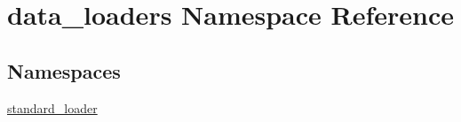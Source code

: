 \hypertarget{namespacedata__loaders}{}\section{data\+\_\+loaders Namespace Reference}
\label{namespacedata__loaders}
\subsection*{Namespaces}
\begin{DoxyCompactItemize}
\item 
 \mbox{\hyperlink{namespacedata__loaders_1_1standard__loader}{standard\+\_\+loader}}
\end{DoxyCompactItemize}
